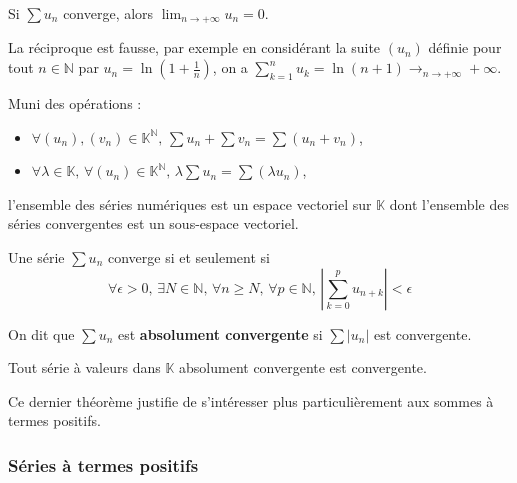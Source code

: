 
	\begin{proposition}
		Si $\sum u_n$ converge, alors $\lim_{n \rightarrow +\infty} u_n = 0$.
	\end{proposition}

	\begin{cexample}
		La réciproque est fausse, par exemple en considérant la suite $(u_n)$ définie pour tout $n \in \mathbb{N}$ par $u_n = \ln(1 + \frac{1}{n})$, on a $\sum_{k=1}^{n} u_k = \ln(n+1) \longrightarrow_{n \rightarrow +\infty} +\infty$.
	\end{cexample}

	\begin{proposition}
		Muni des opérations :
		\begin{itemize}
			\item $\forall (u_n), (v_n) \in \mathbb{K}^{\mathbb{N}}, \, \sum u_n + \sum v_n = \sum (u_n + v_n)$,
			\item $\forall \lambda \in \mathbb{K}, \, \forall (u_n) \in \mathbb{K}^{\mathbb{N}}, \, \lambda \sum u_n = \sum (\lambda u_n)$,
		\end{itemize}
		l'ensemble des séries numériques est un espace vectoriel sur $\mathbb{K}$ dont l'ensemble des séries convergentes est un sous-espace vectoriel.
	\end{proposition}


	\begin{proposition}
		Une série $\sum u_n$ converge si et seulement si
		\[ \forall \epsilon > 0, \, \exists N \in \mathbb{N}, \, \forall n \geq N, \, \forall p \in \mathbb{N}, \, \left| \sum_{k=0}^{p} u_{n+k} \right| < \epsilon \]
	\end{proposition}

	\begin{definition}
		On dit que $\sum u_n$ est \textbf{absolument convergente} si $\sum |u_n|$ est convergente.
	\end{definition}

	\begin{theorem}
		Tout série à valeurs dans $\mathbb{K}$ absolument convergente est convergente.
	\end{theorem}

	Ce dernier théorème justifie de s'intéresser plus particulièrement aux sommes à termes positifs.

	\subsubsection{Séries à termes positifs}

